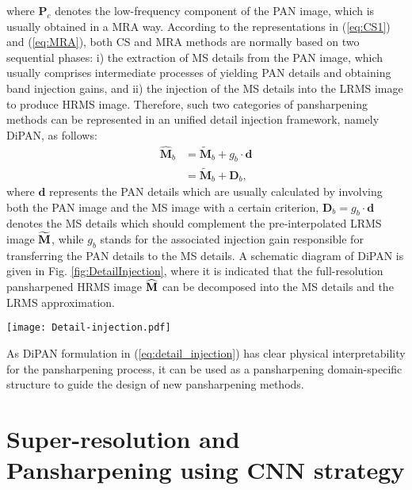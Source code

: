 \documentclass[journal]{IEEEtran}
\begin{document}
where $\mathbf {P}_c$ denotes the low-frequency component of the PAN image, which is usually obtained in a MRA way. According to the representations in (\ref{eq:CS1}) and (\ref{eq:MRA}), both CS and MRA methods are normally based on two sequential phases: i) the extraction of MS details from the PAN image, which usually comprises intermediate processes of yielding PAN details and obtaining band injection gains, and ii) the injection of the MS details into the LRMS image to produce HRMS image. Therefore, such two categories of pansharpening methods can be represented in an unified detail injection framework, namely DiPAN, as follows:
\begin{equation}
   \label{eq:detail_injection} \begin{split}
   {\widehat {\mathbf {M}}}_b &= { \widetilde {\mathbf{M}}}_b  + g_b\cdot\mathbf{d}\\
                              &= { \widetilde {\mathbf{M}}}_b  + {\mathbf D}_b,
\end{split}
\end{equation}
where ${\mathbf d}$ represents the PAN details which are usually calculated by involving both the PAN image and the MS image with a certain criterion, ${\mathbf D}_b=g_b\cdot{\mathbf d}$ denotes the MS details which should complement the pre-interpolated LRMS image ${\bf \widetilde{M}}$, while $g_b$ stands for the associated injection gain responsible for transferring the PAN details to the MS details. A schematic diagram of DiPAN is given in Fig. \ref{fig:DetailInjection}, where it is indicated that the full-resolution pansharpened HRMS image ${\bf \widehat{M}}$ can be decomposed into the MS details and the LRMS approximation.

\begin{figure*}[t]\scriptsize
\centering
\texttt{[image: Detail-injection.pdf]}
\caption{Schematic diagram of the DiPAN framework.}
\label{fig:DetailInjection}
\end{figure*}

As DiPAN formulation in (\ref{eq:detail_injection}) has clear physical interpretability for the pansharpening process, it can be used as a pansharpening domain-specific structure to guide the design of new pansharpening methods.

\section{Super-resolution and Pansharpening using CNN strategy \label{sec:SuperPanMethods}}
\end{document}
